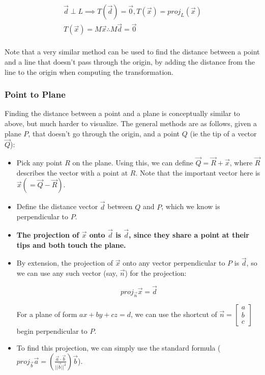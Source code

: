 \documentclass[12pt]{article}
\begin{document}
\begin{equation}
    \begin{split}
        \vec{d}\perp L \implies T(\vec{d}) = \vec{0}, T(\vec{x}) = proj_L (\vec{x}) \\
        T(\vec{x}) = M\vec{x} \therefore M\vec{d} = \vec{0} \\
    \end{split}
\end{equation}

Note that a very similar method can be used to find the distance between a point and a line that doesn't pass through the origin, by adding the distance from the line to the origin when computing the transformation. 


\subsubsection{Point to Plane}

Finding the distance between a point and a plane is conceptually similar to above, but much harder to visualize. The general methods are as follows, given a plane $P$, that doesn't go through the origin, and a point $Q$ (ie the tip of a vector $\vec{Q}$):
\begin{itemize}
    \item Pick any point $R$ on the plane. Using this, we can define $\vec{Q} = \vec{R} + \vec{x}$, where $\vec{R}$ describes the vector with a point at $R$. Note that the important vector here is $\vec{x} ( = \vec{Q}-\vec{R})$.
    \item Define the distance vector $\vec{d}$ between $Q$ and $P$, which we know is perpendicular to $P$.
    \item \textbf{The projection of $\vec{x}$ onto $\vec{d}$ is $\vec{d}$, since they share a point at their tips and both touch the plane.}
    \item By extension, the projection of $\vec{x}$ onto any vector perpendicular to $P$ is $\vec{d}$, so we can use any such vector (say, $\vec{n}$) for the projection:
    
    $$proj_{\vec{n}}\vec{x} = \vec{d}$$

    For a plane of form $ax+by+cz=d$, we can use the shortcut of  $\vec{n} = \begin{bmatrix}
        a \\
        b \\
        c
    \end{bmatrix}$ begin perpendicular to $P$.
    \item To find this projection, we can simply use the standard formula ($proj_{\vec{b}}\vec{a}=(\frac{\vec{a}\cdot\vec{b}}{||\vec{b}||^2})\vec{b}$).

\end{itemize}
\end{document}
